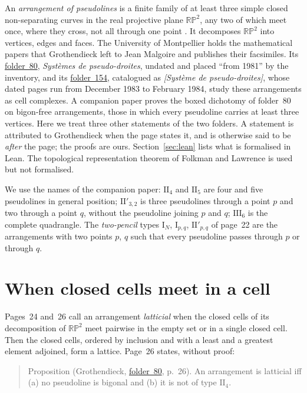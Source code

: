 \documentclass[11pt,a4paper]{amsart}
\theoremstyle{definition}
\theoremstyle{remark}
\newcommand{\II}[1]{\mathrm{II}_{#1}}
\newcommand{\IIp}{\mathrm{II}'_{3,2}}
\newcommand{\III}{\mathrm{III}_{6}}
\newcommand{\PP}{\mathbb{RP}^2}
\newcommand{\fac}[1]{\href{https://grothendieck.umontpellier.fr/#1.pdf}{folder~#1}}
\begin{document}
An \emph{arrangement of pseudolines} is a finite family of at least three simple closed non-separating curves in the real projective plane $\PP$, any two of which meet once, where they cross, not all through one point \cite{grunbaum1972, felsnergoodman2017}. It decomposes $\PP$ into vertices, edges and faces. The University of Montpellier holds the mathematical papers that Grothendieck left to Jean Malgoire and publishes their facsimiles. Its \fac{80}, \emph{Systèmes de pseudo-droites}, undated and placed ``from 1981'' by the inventory, and its \fac{154}, catalogued as \emph{[Système de pseudo-droites]}, whose dated pages run from December 1983 to February 1984, study these arrangements as cell complexes. A companion paper \cite{huabigon} proves the boxed dichotomy of folder~80 on bigon-free arrangements, those in which every pseudoline carries at least three vertices. Here we treat three other statements of the two folders. A statement is attributed to Grothendieck when the page states it, and is otherwise said to be \emph{after} the page; the proofs are ours. Section~\ref{sec:lean} lists what is formalised in Lean. The topological representation theorem of Folkman and Lawrence \cite{folkmanlawrence1978} is used but not formalised.

We use the names of the companion paper: $\II4$ and $\II5$ are four and five pseudolines in general position; $\IIp$ is three pseudolines through a point $p$ and two through a point $q$, without the pseudoline joining $p$ and $q$; $\III$ is the complete quadrangle. The \emph{two-pencil} types $\mathrm I_N$, $\mathrm I_{p,q}$, $\mathrm{II}'_{p,q}$ of page~22 are the arrangements with two points $p$, $q$ such that every pseudoline passes through $p$ or through $q$.

\section{When closed cells meet in a cell}\label{sec:lattice}

Pages~24 and~26 call an arrangement \emph{latticial} when the closed cells of its decomposition of $\PP$ meet pairwise in the empty set or in a single closed cell. Then the closed cells, ordered by inclusion and with a least and a greatest element adjoined, form a lattice. Page~26 states, without proof:

\begin{quote}
Proposition (Grothendieck, \fac{80}, p.~26). An arrangement is latticial iff (a) no pseudoline is bigonal and (b) it is not of type $\II4$.
\end{quote}
\end{document}
